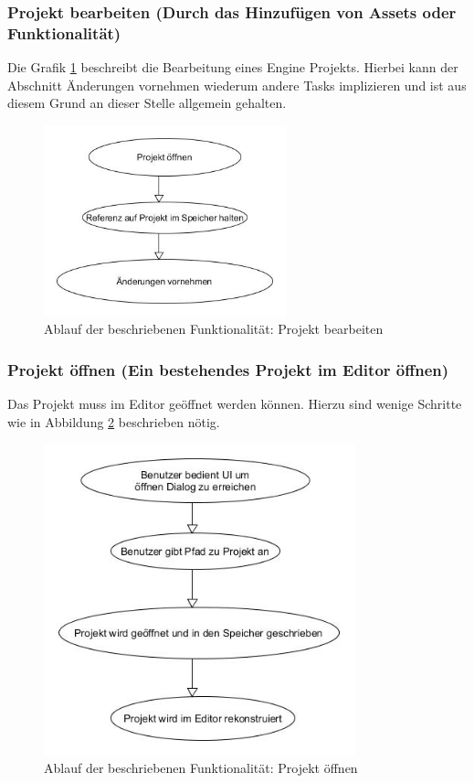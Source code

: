 \documentclass[pagesize, paper=a4, fontsize=12pt, titlepage=true, headings=small, headnosepline, abstractoff, liststotoc, nochapterprefix, plainheadsepline, twoside]{scrreprt}
\begin{document}
\subsubsection{Projekt bearbeiten (Durch das Hinzufügen von Assets oder Funktionalität)}
Die Grafik \ref{re:projektbearbeiten} beschreibt die Bearbeitung eines Engine Projekts. Hierbei kann der Abschnitt \glqq Änderungen vornehmen\grqq{} wiederum andere Tasks implizieren und ist aus diesem Grund an dieser Stelle allgemein gehalten.
\begin{figure}[ht]
	\centering
	\includegraphics[width=7cm]{Bilder/ProjektBearbeiten.jpg}
	\caption{Ablauf der beschriebenen Funktionalität: Projekt bearbeiten}
	\label{re:projektbearbeiten}
\end{figure}

\subsubsection{Projekt öffnen (Ein bestehendes Projekt im Editor öffnen)}
Das Projekt muss im Editor geöffnet werden können. Hierzu sind wenige Schritte wie in Abbildung \ref{re:projektöffnen} beschrieben nötig.
\begin{figure}[ht]
	\centering
	\includegraphics[width=9cm]{Bilder/ProjektOeffnen.jpg}
	\caption{Ablauf der beschriebenen Funktionalität: Projekt öffnen}
	\label{re:projektöffnen}
\end{figure}
\end{document}
